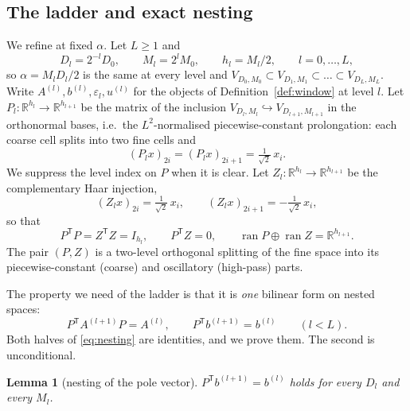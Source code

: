 \documentclass[11pt,a4paper]{article}
\theoremstyle{plain}
\newtheorem{lemma}[theorem]{Lemma}
\theoremstyle{definition}
\newcommand{\R}{\mathbb{R}}
\newcommand{\T}{\mathsf{T}}
\newcommand{\ran}{\operatorname{ran}}
\begin{document}
\subsection{The ladder and exact nesting}
\label{sec:ladder}

We refine at fixed $\alpha$. Let $L\ge1$ and
\begin{equation}
\label{eq:levels}
  D_{l}=2^{-l}D_{0},\qquad M_{l}=2^{l}M_{0},\qquad h_{l}=M_{l}/2,
  \qquad l=0,\dots,L,
\end{equation}
so $\alpha=M_{l}D_{l}/2$ is the same at every level and
$V_{D_{0},M_{0}}\subset V_{D_{1},M_{1}}\subset\dots\subset V_{D_{L},M_{L}}$. Write
$A^{(l)},b^{(l)},\varepsilon_{l},u^{(l)}$ for the objects of
Definition~\ref{def:window} at level $l$. Let $P_{l}:\R^{h_{l}}\to\R^{h_{l+1}}$ be
the matrix of the inclusion $V_{D_{l},M_{l}}\hookrightarrow V_{D_{l+1},M_{l+1}}$ in
the orthonormal bases, i.e.\ the $L^{2}$-normalised piecewise-constant prolongation:
each coarse cell splits into two fine cells and
\begin{equation}
\label{eq:P}
  (P_{l}x)_{2i}=(P_{l}x)_{2i+1}=\tfrac{1}{\sqrt2}\,x_{i}.
\end{equation}
We suppress the level index on $P$ when it is clear. Let
$Z_{l}:\R^{h_{l}}\to\R^{h_{l+1}}$ be the complementary Haar injection,
\begin{equation}
\label{eq:Z}
  (Z_{l}x)_{2i}=\tfrac{1}{\sqrt2}\,x_{i},\qquad
  (Z_{l}x)_{2i+1}=-\tfrac{1}{\sqrt2}\,x_{i},
\end{equation}
so that
\begin{equation}
\label{eq:isometries}
  P^{\T}P=Z^{\T}Z=I_{h_{l}},\qquad P^{\T}Z=0,\qquad
  \ran P\oplus\ran Z=\R^{h_{l+1}} .
\end{equation}
The pair $(P,Z)$ is a two-level orthogonal splitting of the fine space into its
piecewise-constant (coarse) and oscillatory (high-pass) parts.

The property we need of the ladder is that it is \emph{one} bilinear form on nested
spaces:
\begin{equation}
\label{eq:nesting}
  P^{\T}A^{(l+1)}P=A^{(l)},
  \qquad
  P^{\T}b^{(l+1)}=b^{(l)}
  \qquad (l<L).
\end{equation}
Both halves of \eqref{eq:nesting} are identities, and we prove them. The second is
unconditional.

\begin{lemma}[nesting of the pole vector]
\label{lem:bnesting}
$P^{\T}b^{(l+1)}=b^{(l)}$ holds for every $D_{l}$ and every $M_{l}$.
\end{lemma}
\end{document}

